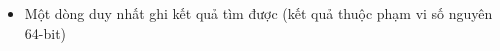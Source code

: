 \begin{itemize}
	\item     Một dòng duy nhất ghi kết quả tìm được (kết quả thuộc phạm vi số nguyên 64-bit)   
\end{itemize}